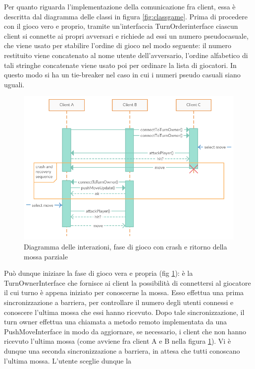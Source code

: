 Per quanto riguarda l'implementazione della comunicazione fra client, essa è descritta dal
diagramma delle classi in figura \ref{fig:classgame}.
Prima di procedere con il gioco vero e proprio, tramite un'interfaccia 
TurnOrderinterface ciascun client si connette ai propri avversari e richiede ad 
essi un numero pseudocasuale, che viene usato per stabilire l'ordine di gioco 
nel modo seguente: il numero restituito viene concatenato al nome utente 
dell'avversario, l'ordine alfabetico di tali stringhe concatenate viene usato 
poi per ordinare la lista di giocatori. In questo modo si ha un tie-breaker nel 
caso in cui i numeri pseudo casuali siano uguali.
\\
\begin{figure}[!ht]
    \centering
    \includegraphics[scale=0.65,center]{core/imgs/UML/sequence/game.png}
    \caption{Diagramma delle interazioni, fase di gioco con crash e ritorno 
della mossa parziale}
    \label{fig:gameseq}
\end{figure}
Può dunque iniziare la fase di gioco vera e propria (fig \ref{fig:gameseq}): è 
la TurnOwnerInterface 
che fornisce ai client la possibilità di connettersi al giocatore il cui turno 
è appena iniziato per conoscerne la mossa. Esso effettua una prima 
sincronizzazione a barriera, per controllare il numero degli utenti connessi e 
conoscere l'ultima mossa che essi hanno ricevuto. Dopo tale sincronizzazione, 
il turn owner effettua una chiamata a metodo remoto implementata da una 
PushMoveInterface in modo da aggiornare, se necessario, i client che non hanno 
ricevuto l'ultima mossa (come avviene fra client A e B nella figura 
\ref{fig:gameseq}). Vi è dunque una seconda sincronizzazione a barriera, 
in attesa che tutti conoscano l'ultima mossa. L'utente sceglie dunque la 
